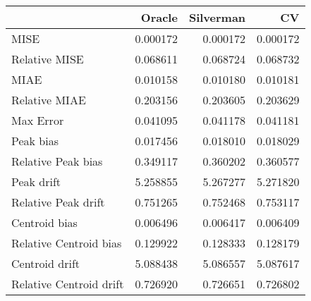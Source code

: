 \begin{tabular}{lrrr}
  \hline
 & Oracle & Silverman & CV \\ 
  \hline
MISE & 0.000172 & 0.000172 & 0.000172 \\ 
  Relative MISE & 0.068611 & 0.068724 & 0.068732 \\ 
  MIAE & 0.010158 & 0.010180 & 0.010181 \\ 
  Relative MIAE & 0.203156 & 0.203605 & 0.203629 \\ 
  Max Error & 0.041095 & 0.041178 & 0.041181 \\ 
  Peak bias & 0.017456 & 0.018010 & 0.018029 \\ 
  Relative Peak bias & 0.349117 & 0.360202 & 0.360577 \\ 
  Peak drift & 5.258855 & 5.267277 & 5.271820 \\ 
  Relative Peak drift & 0.751265 & 0.752468 & 0.753117 \\ 
  Centroid bias & 0.006496 & 0.006417 & 0.006409 \\ 
  Relative Centroid bias & 0.129922 & 0.128333 & 0.128179 \\ 
  Centroid drift & 5.088438 & 5.086557 & 5.087617 \\ 
  Relative Centroid drift & 0.726920 & 0.726651 & 0.726802 \\ 
   \hline
\end{tabular}
